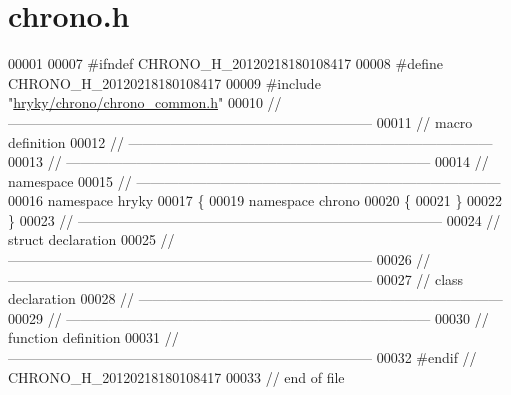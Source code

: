\hypertarget{chrono_8h_source}{\section{chrono.\-h}
}

\begin{DoxyCode}
00001 
00007 \textcolor{preprocessor}{#ifndef CHRONO\_H\_20120218180108417}
00008 \textcolor{preprocessor}{}\textcolor{preprocessor}{#define CHRONO\_H\_20120218180108417}
00009 \textcolor{preprocessor}{}\textcolor{preprocessor}{#include "\hyperlink{chrono__common_8h}{hryky/chrono/chrono_common.h}"}
00010 \textcolor{comment}{//
      ------------------------------------------------------------------------------}
00011 \textcolor{comment}{// macro definition}
00012 \textcolor{comment}{//
      ------------------------------------------------------------------------------}
00013 \textcolor{comment}{//
      ------------------------------------------------------------------------------}
00014 \textcolor{comment}{// namespace}
00015 \textcolor{comment}{//
      ------------------------------------------------------------------------------}
00016 \textcolor{keyword}{namespace }hryky
00017 \{
00019 \textcolor{keyword}{namespace }chrono
00020 \{
00021 \}
00022 \}
00023 \textcolor{comment}{//
      ------------------------------------------------------------------------------}
00024 \textcolor{comment}{// struct declaration}
00025 \textcolor{comment}{//
      ------------------------------------------------------------------------------}
00026 \textcolor{comment}{//
      ------------------------------------------------------------------------------}
00027 \textcolor{comment}{// class declaration}
00028 \textcolor{comment}{//
      ------------------------------------------------------------------------------}
00029 \textcolor{comment}{//
      ------------------------------------------------------------------------------}
00030 \textcolor{comment}{// function definition}
00031 \textcolor{comment}{//
      ------------------------------------------------------------------------------}
00032 \textcolor{preprocessor}{#endif // CHRONO\_H\_20120218180108417}
00033 \textcolor{preprocessor}{}\textcolor{comment}{// end of file}
\end{DoxyCode}
